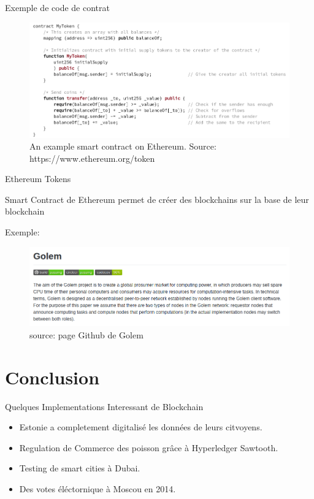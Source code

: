 \documentclass[xcolor=dvipsnames]{beamer}
\begin{document}
\begin{frame}{Exemple de code de contrat}

	\begin{figure}
		\centering
		\includegraphics[scale=.35]{contract_example}
		\caption{An example smart contract on Ethereum. Source: https://www.ethereum.org/token}
	\end{figure}

\end{frame}

\begin{frame}{Ethereum Tokens}

	\begin{center}
		\color{blue}
		Smart Contract de Ethereum permet de créer des blockchains sur la base de leur blockchain
	\end{center}
	
	Exemple:
	\begin{figure}
	\includegraphics[scale=.35]{golem}
	\caption{source: page Github de Golem}
	\end{figure}

\end{frame}

\section{Conclusion}

\begin{frame}{Quelques Implementations Interessant de Blockchain}

	\begin{itemize}
		\item Estonie a completement digitalisé les données de leurs citvoyens.
		\item Regulation de Commerce des poisson grâce à Hyperledger Sawtooth.
		\item Testing de smart cities à Dubai.
		\item Des votes éléctornique à Moscou en 2014.
	\end{itemize}
	
\end{frame}
\end{document}

